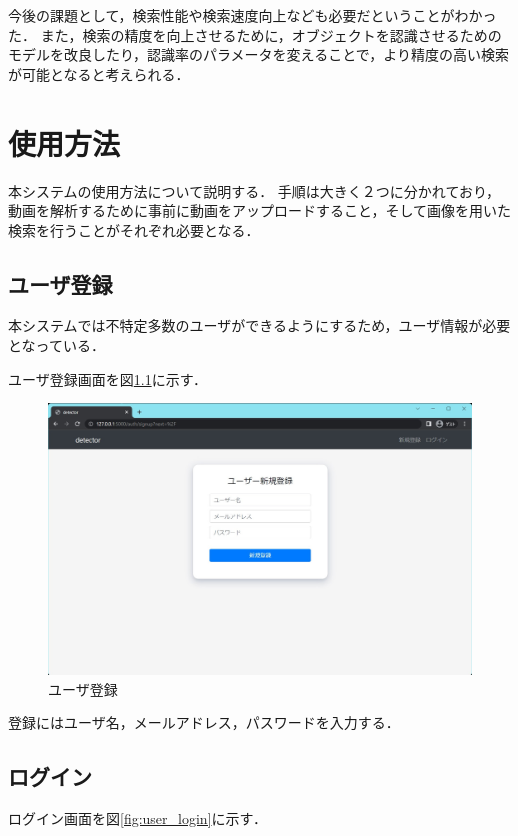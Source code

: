 \documentclass[a4j,12pt,dvipdfmx]{jreport}
\begin{document}
今後の課題として，検索性能や検索速度向上なども必要だということがわかった．
また，検索の精度を向上させるために，オブジェクトを認識させるためのモデルを改良したり，認識率のパラメータを変えることで，より精度の高い検索が可能となると考えられる．

\clearpage


\chapter{使用方法}
\label{sec:usage}
本システムの使用方法について説明する．
手順は大きく２つに分かれており，動画を解析するために事前に動画をアップロードすること，そして画像を用いた検索を行うことがそれぞれ必要となる．

\section{ユーザ登録}
本システムでは不特定多数のユーザができるようにするため，ユーザ情報が必要となっている．

ユーザ登録画面を図\ref{fig:user_register}に示す．

\begin{figure}[H]
  \centering
  \includegraphics[width=13cm]{image/user_register.jpg}
  \caption{ユーザ登録}
  \label{fig:user_register}
\end{figure}

登録にはユーザ名，メールアドレス，パスワードを入力する．

\section{ログイン}
ログイン画面を図\ref{fig:user_login}に示す．
\end{document}
